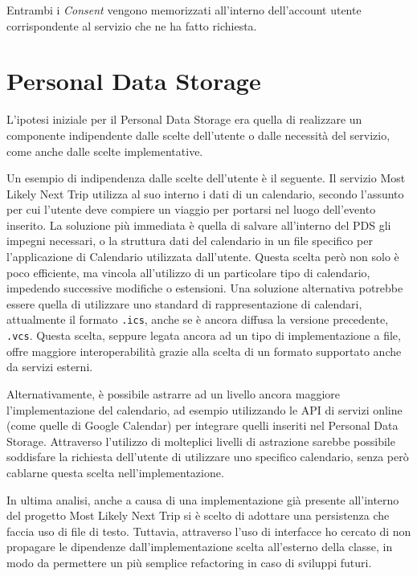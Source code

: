 Entrambi i \textit{Consent} vengono memorizzati all’interno dell’account utente corrispondente al servizio che ne ha fatto richiesta.

\section{Personal Data Storage}
L’ipotesi iniziale per il Personal Data Storage era quella di realizzare un componente indipendente dalle scelte dell’utente o dalle necessit\`a del servizio, come anche dalle scelte implementative. 

Un esempio di indipendenza dalle scelte dell’utente \`e il seguente. Il servizio Most Likely Next Trip utilizza al suo interno i dati di un calendario, secondo l’assunto per cui l’utente deve compiere un viaggio per portarsi nel luogo dell’evento inserito. La soluzione pi\`u immediata \`e quella di salvare all’interno del PDS gli impegni necessari, o la struttura dati del calendario in un file specifico per l’applicazione di Calendario utilizzata dall’utente. Questa scelta per\`o non solo \`e poco efficiente, ma vincola all’utilizzo di un particolare tipo di calendario, impedendo successive modifiche o estensioni. Una soluzione alternativa potrebbe essere quella di utilizzare uno standard di rappresentazione di calendari, attualmente il formato \texttt{.ics}, anche se \`e ancora diffusa la versione precedente, \texttt{.vcs}. Questa scelta, seppure legata ancora ad un tipo di implementazione a file, offre maggiore interoperabilit\`a grazie alla scelta di un formato supportato anche da servizi esterni.

Alternativamente, \`e possibile astrarre ad un livello ancora maggiore l’implementazione del calendario, ad esempio utilizzando le API di servizi online (come quelle di Google Calendar\cite{googlecalendarapi}) per integrare quelli inseriti nel Personal Data Storage. Attraverso l’utilizzo di molteplici livelli di astrazione sarebbe possibile soddisfare la richiesta dell’utente di utilizzare uno specifico calendario, senza per\`o cablarne questa scelta nell’implementazione.

In ultima analisi, anche a causa di una implementazione gi\`a presente all’interno del progetto Most Likely Next Trip si \`e scelto di adottare una persistenza che faccia uso di file di testo. Tuttavia, attraverso l’uso di interfacce ho cercato di non propagare le dipendenze dall’implementazione scelta all’esterno della classe, in modo da permettere un pi\`u semplice refactoring in caso di sviluppi futuri.

